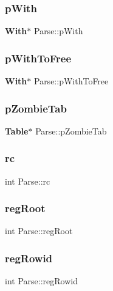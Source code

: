\mbox{\label{struct_parse_a7a812b036ddcc4b838b956328e1ff03e}} 
\subsubsection{pWith}
{\footnotesize\ttfamily \textbf{ With}$\ast$ Parse\+::p\+With}

\mbox{\label{struct_parse_ae8e4463fa9d87da2833a542e27dd722d}} 
\subsubsection{pWithToFree}
{\footnotesize\ttfamily \textbf{ With}$\ast$ Parse\+::p\+With\+To\+Free}

\mbox{\label{struct_parse_a4e8319f0a7f0d21e472c13ac6cf67060}} 
\subsubsection{pZombieTab}
{\footnotesize\ttfamily \textbf{ Table}$\ast$ Parse\+::p\+Zombie\+Tab}

\mbox{\label{struct_parse_a897c2ea40a1065d49a134f18ca251637}} 
\subsubsection{rc}
{\footnotesize\ttfamily int Parse\+::rc}

\mbox{\label{struct_parse_afcf3d47e9424b79e6911cf366cb73bd4}} 
\subsubsection{regRoot}
{\footnotesize\ttfamily int Parse\+::reg\+Root}

\mbox{\label{struct_parse_a63f71c268a7a77cb0df5619dd8ebbacd}} 
\subsubsection{regRowid}
{\footnotesize\ttfamily int Parse\+::reg\+Rowid}

\mbox{\label{struct_parse_aa3fe38b31dd1cd0fbea4de0e77891642}} 

